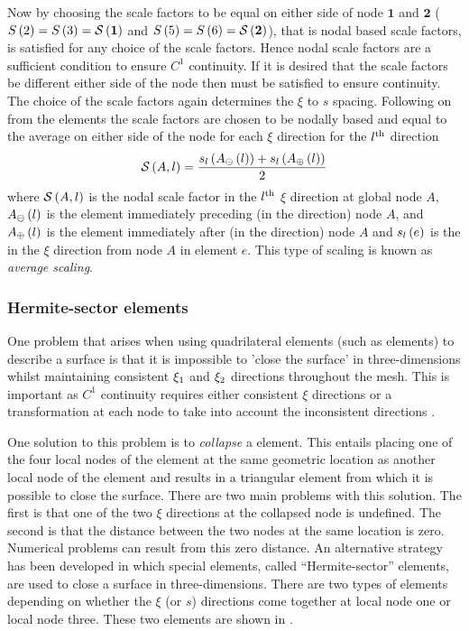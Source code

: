Now by choosing the scale factors to be equal on either side of node
$\mathbf{1}$ and $\mathbf{2}$ (\ie $   S \left( {2} \right)  =   S \left( {3} \right)  =   \mathcal{S} \left( \mathbf{1} \right)  $
and $   S \left( {5} \right)  =   S \left( {6} \right)  =   \mathcal{S} \left( \mathbf{2} \right)  $), that is nodal based scale
factors,  is satisfied for any choice of the scale
factors.  Hence nodal scale factors are a sufficient condition to ensure
$C^{1}$ continuity. If it is desired that the scale factors be different
either side of the node then  must be satisfied to
ensure continuity. The choice of the scale factors again determines the $\xi$
to $s$ spacing. Following on from the \cubicherm elements the scale factors
are chosen to be nodally based and equal to the average \arclen on either side
of the node for each $\xi$ direction \ie for the ${l}^{\text{th}}$ direction
\begin{equation}
     \mathcal{S} \left( A,l \right)  =\dfrac{ s_{l}\left(  A_{\ominus}\left( l \right)  \right) +
     s_{l}\left(  A_{\oplus}\left( l \right)  \right) }{2}
  \label{eqn:avearclenscale}
\end{equation}
where $   \mathcal{S} \left( A,l \right)  $ is the nodal scale factor in the ${l}^{\text{th}}$ $\xi$
direction at global node $A$, $ A_{\ominus}\left( l \right) $ is the element
immediately preceding (in the  direction) node $A$, and
$ A_{\oplus}\left( l \right) $ is the element immediately after (in the 
direction) node $A$ and $ s_{l}\left( e \right) $ is the \arclen in the  $\xi$
direction from node $A$ in element $e$. This type of scaling is known as
\emph{average \arclen scaling}.

\subsubsection{Hermite-sector elements}
\label{sec:hselements}

One problem that arises when using quadrilateral elements (such as
\bicubicherm elements) to describe a surface is that it is impossible to
'close the surface' in three-dimensions whilst maintaining consistent $\xi_{1}$
and $\xi_{2}$ directions throughout the mesh. This is important as $C^{1}$
continuity requires either consistent $\xi$ directions or a transformation at
each node to take into account the inconsistent directions \cite{petera:1994}.

One solution to this problem is to \emph{collapse} a \bicubicherm element.
This entails placing one of the four local nodes of the element at the same
geometric location as another local node of the element and results in a
triangular element from which it is possible to close the surface. There are
two main problems with this solution.  The first is that one of the two $\xi$
directions at the collapsed node is undefined.  The second is that the
distance between the two nodes at the same location is zero.  Numerical
problems can result from this zero distance.  An alternative strategy has
been developed in which special elements, called ``Hermite-sector''
elements, are used to close a \bicubicherm
surface in three-dimensions. There are two types of elements depending on
whether the $\xi$ (or $s$) directions come together at local node one or local
node three.  These two elements are shown in .

